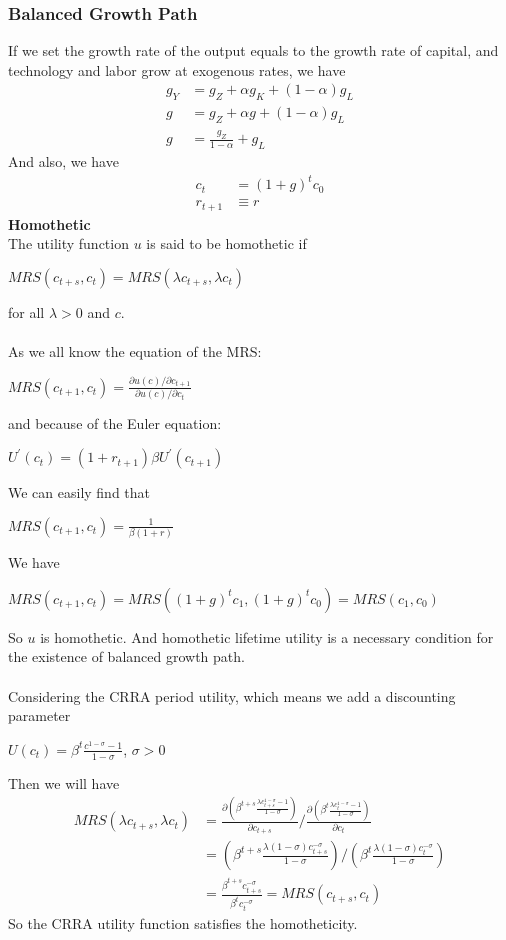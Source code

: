 \documentclass{article}
\begin{document}
\subsubsection{Balanced Growth Path} 
If we set the growth rate of the output equals to the growth rate of capital, and technology and labor grow at exogenous rates, we have
\begin{align*}
	g_Y &= g_Z + \alpha g_K + (1 - \alpha)g_L\\
	g &= g_Z + \alpha g + (1 - \alpha)g_L\\
	g &= \frac{g_Z}{1 - \alpha} + g_L
\end{align*}
And also, we have
\begin{align*}
	c_t &= (1 + g)^t c_0\\
	r_{t+1} &\equiv r
\end{align*}
\textbf{Homothetic}\\
The utility function $u$ is said to be homothetic if\\
\centerline{$MRS(c_{t+s}, c_t) = MRS(\lambda c_{t+s}, \lambda c_t)$}
for all $\lambda > 0$ and $c$.\\\\
As we all know the equation of the MRS:\\
\centerline{$MRS(c_{t+1}, c_t) = \frac{\partial u(c)/\partial c_{t+1}}{\partial u(c)/\partial c_t}$}
and because of the Euler equation:\\
\centerline{$U^\prime(c_t) = (1 + r_{t+1})\beta U^\prime(c_{t+1})$}
We can easily find that\\
\centerline{$MRS(c_{t+1}, c_t) = \frac{1}{\beta (1 + r)}$}
We have\\
\centerline{$MRS(c_{t+1}, c_t) = MRS((1 + g)^tc_1, (1 + g)^tc_0) = MRS(c_1, c_0)$}
So $u$ is homothetic. And homothetic lifetime utility is a necessary condition for the existence of balanced growth path.\\\\
Considering the CRRA period utility, which means we add a discounting parameter\\
\centerline{$U(c_t) = \beta^t \frac{c^{1-\sigma} - 1}{1 - \sigma}$, $\sigma > 0$}
Then we will have
\begin{align*}
	MRS(\lambda c_{t+s}, \lambda c_t) &= \frac{\partial (\beta^{t+s} \frac{\lambda c^{1-\sigma}_{t+s} - 1}{1 - \sigma})}{\partial c_{t+s}} / \frac{\partial (\beta^{t} \frac{\lambda c^{1-\sigma}_t - 1}{1 - \sigma})}{\partial c_t}\\
	&= (\beta^{t+s} \frac{\lambda(1 - \sigma)c^{-\sigma}_{t+s}}{1 - \sigma}) / (\beta^t \frac{\lambda(1 - \sigma)c^{-\sigma}_t}{1 - \sigma})\\
	&= \frac{\beta^{t+s}c^{-\sigma}_{t+s}}{\beta^t c^{-\sigma}_t} = MRS(c_{t+s}, c_t)
\end{align*}
So the CRRA utility function satisfies the homotheticity.
\end{document}
